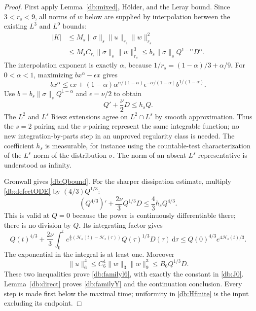 \documentclass[11pt,a4paper]{article}
\theoremstyle{definition}\newtheorem{hypothesis}[theorem]{Hypothesis}
\theoremstyle{remark}\newtheorem{remark}[theorem]{Remark}
\newcommand{\dd}{\,\mathrm d}
\newcommand{\norm}[1]{\lVert #1\rVert}
\numberwithin{equation}{section}
\begin{document}
\begin{proof}
First apply Lemma~\ref{db:mixed}, H\"older, and the Leray bound. Since
$3<r_s<9$, all norms of $w$ below are supplied by interpolation between the
existing $L^3$ and $L^9$ bounds:
\begin{align*}
 |K|&\le M_s\norm\sigma_s\norm u_{r_s}\norm w_{r_s}^2\\
 &\le M_s C_{r_s}\norm\sigma_s\norm w_{r_s}^3
 \le b_s\norm\sigma_s Q^{1-\alpha}D^\alpha.
\end{align*}
The interpolation exponent is exactly $\alpha$, because
$1/r_s=(1-\alpha)/3+\alpha/9$. For $0<\alpha<1$, maximizing
$bx^\alpha-\epsilon x$ gives
\begin{equation}\label{db:younggeneral}
 bx^\alpha\le\epsilon x+
 (1-\alpha)\alpha^{\alpha/(1-\alpha)}
 \epsilon^{-\alpha/(1-\alpha)}b^{1/(1-\alpha)}.
\end{equation}
Use $b=b_s\norm\sigma_s Q^{1-\alpha}$ and $\epsilon=\nu/2$ to obtain
\begin{equation}\label{db:defectODE}
 Q'+\frac\nu2D\le h_s Q.
\end{equation}
The $L^2$ and $L^s$ Riesz extensions agree on $L^2\cap L^s$ by smooth
approximation. Thus the $s=2$ pairing and the $s$-pairing represent the same
integrable function; no new integration-by-parts step in an unproved
regularity class is needed.
The coefficient $h_s$ is measurable, for instance using the countable-test
characterization of the $L^s$ norm of the distribution $\sigma$. The norm
of an absent $L^s$ representative is understood as infinity.

Gronwall gives \eqref{db:Qbound}. For the sharper dissipation estimate,
multiply \eqref{db:defectODE} by $(4/3)Q^{1/3}$:
\[
 (Q^{4/3})'+\frac{2\nu}{3}Q^{1/3}D
 \le\frac43 h_sQ^{4/3}.
\]
This is valid at $Q=0$ because the power is continuously differentiable there;
there is no division by $Q$. Its integrating factor gives
\[
 Q(t)^{4/3}+\frac{2\nu}{3}\int_0^t
 e^{\frac43(\mathcal H_s(t)-\mathcal H_s(\tau))}
 Q(\tau)^{1/3}D(\tau)\dd\tau
 \le Q(0)^{4/3}e^{4\mathcal H_s(t)/3}.
\]
The exponential in the integral is at least one. Moreover
\[
 \norm u_6^4\le C_6^4\norm w_3\norm w_9^3
              \le B_6Q^{1/3}D.
\]
These two inequalities prove \eqref{db:familyl6}, with exactly the constant
in \eqref{db:J0}. Lemma~\ref{db:direct} proves \eqref{db:familyY} and the
continuation conclusion. Every step is made first below the maximal time;
uniformity in \eqref{db:Hfinite} is the input excluding its endpoint.
\end{proof}
\end{document}
